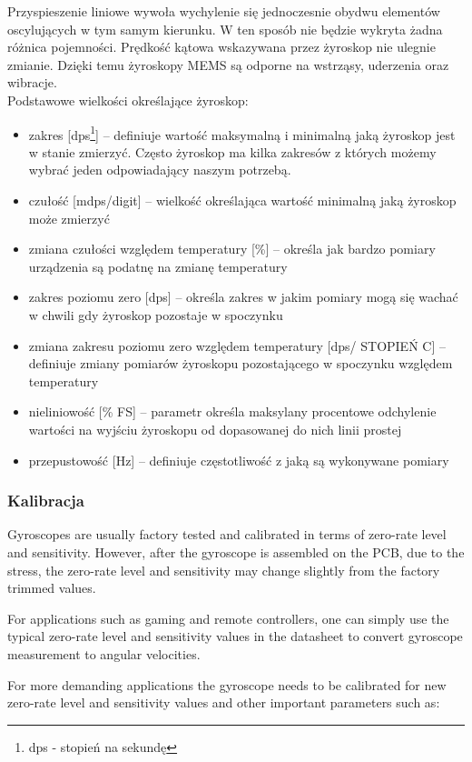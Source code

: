 Przyspieszenie liniowe wywoła wychylenie się jednoczesnie obydwu elementów oscylujących w tym samym kierunku. W ten sposób
nie będzie wykryta żadna różnica pojemności. Prędkość kątowa wskazywana przez żyroskop nie ulegnie zmianie. Dzięki temu
żyroskopy MEMS są odporne na wstrząsy, uderzenia oraz wibracje.
\\
Podstawowe wielkości określające żyroskop:
\begin{itemize}
 \item zakres [dps\footnote{dps - stopień na sekundę}] -- definiuje wartość maksymalną i minimalną jaką żyroskop jest w stanie
 zmierzyć. Często żyroskop ma kilka zakresów z których możemy wybrać jeden odpowiadający naszym potrzebą.
 \item czułość [mdps/digit] -- wielkość określająca wartość minimalną jaką żyroskop może zmierzyć
 \item zmiana czułości względem temperatury [\%] -- określa jak bardzo pomiary urządzenia są podatnę na zmianę temperatury
 \item zakres poziomu zero [dps] -- określa zakres w jakim pomiary mogą się wachać w chwili gdy żyroskop pozostaje w spoczynku
 \item zmiana zakresu poziomu zero względem temperatury [dps/ STOPIEŃ C] -- definiuje zmiany pomiarów żyroskopu pozostającego w spoczynku
 względem temperatury
 \item nieliniowość [\% FS] -- parametr określa maksylany procentowe odchylenie wartości na wyjściu żyroskopu od dopasowanej do nich linii prostej
 \item przepustowość [Hz] -- definiuje częstotliwość z jaką są wykonywane pomiary
\end{itemize}

\subsubsection{Kalibracja}
Gyroscopes are usually factory tested and calibrated in terms of zero-rate level and sensitivity. However, after the gyroscope is assembled on the PCB, due to the stress, the zero-rate level and sensitivity may change slightly from the factory trimmed values.

For applications such as gaming and remote controllers, one can simply use the typical zero-rate level and sensitivity values in the datasheet to convert gyroscope measurement to angular velocities.

For more demanding applications the gyroscope needs to be calibrated for new zero-rate level and sensitivity values and other important parameters such as:

